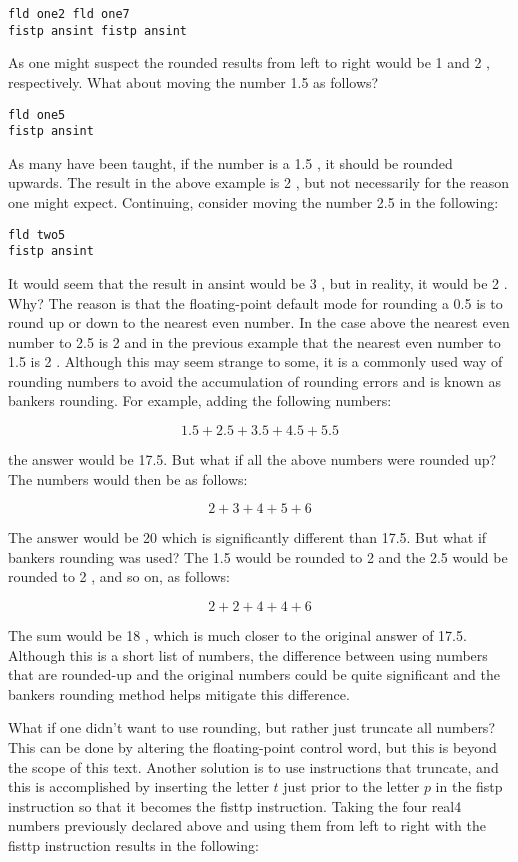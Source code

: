 \documentclass[10pt]{article}
\begin{document}
\begin{verbatim}
fld one2 fld one7
fistp ansint fistp ansint
\end{verbatim}

As one might suspect the rounded results from left to right would be 1 and 2 , respectively. What about moving the number 1.5 as follows?

\begin{verbatim}
fld one5
fistp ansint
\end{verbatim}

As many have been taught, if the number is a 1.5 , it should be rounded upwards. The result in the above example is 2 , but not necessarily for the reason one might expect. Continuing, consider moving the number 2.5 in the following:

\begin{verbatim}
fld two5
fistp ansint
\end{verbatim}

It would seem that the result in ansint would be 3 , but in reality, it would be 2 . Why? The reason is that the floating-point default mode for rounding a 0.5 is to round up or down to the nearest even number. In the case above the nearest even number to 2.5 is 2 and in the previous example that the nearest even number to 1.5 is 2 . Although this may seem strange to some, it is a commonly used way of rounding numbers to avoid the accumulation of rounding errors and is known as bankers rounding. For example, adding the following numbers:

$$
1.5+2.5+3.5+4.5+5.5
$$

the answer would be 17.5. But what if all the above numbers were rounded up? The numbers would then be as follows:

$$
2+3+4+5+6
$$

The answer would be 20 which is significantly different than 17.5. But what if bankers rounding was used? The 1.5 would be rounded to 2 and the 2.5 would be rounded to 2 , and so on, as follows:

$$
2+2+4+4+6
$$

The sum would be 18 , which is much closer to the original answer of 17.5. Although this is a short list of numbers, the difference between using numbers that are rounded-up and the original numbers could be quite significant and the bankers rounding method helps mitigate this difference.

What if one didn't want to use rounding, but rather just truncate all numbers? This can be done by altering the floating-point control word, but this is beyond the scope of this text. Another solution is to use instructions that truncate, and this is accomplished by inserting the letter $t$ just prior to the letter $p$ in the fistp instruction so that it becomes the fisttp instruction. Taking the four real4 numbers previously declared above and using them from left to right with the fisttp instruction results in the following:
\end{document}
